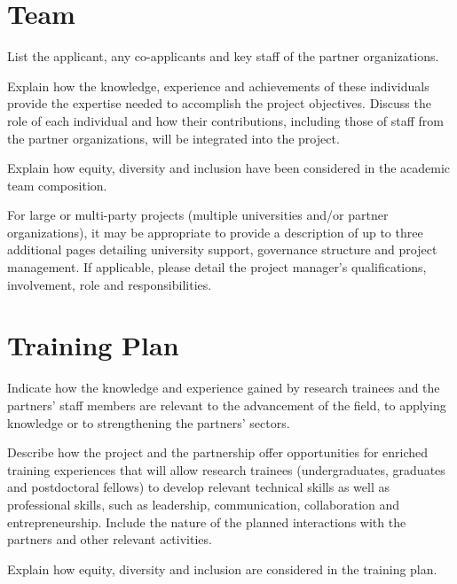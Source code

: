 \documentclass[english]{nserc-alliance}
\begin{document}
\section*{Team}
\ifinst\begin{instructions}
\item List the applicant, any co-applicants and key staff of the partner organizations.
\item Explain how the knowledge, experience and achievements of these individuals provide the expertise needed to accomplish the project objectives. Discuss the role of each individual and how their contributions, including those of staff from the partner organizations, will be integrated into the project.
\item Explain how equity, diversity and inclusion have been considered in the academic team composition.
\item For large or multi-party projects (multiple universities and/or partner organizations), it may be appropriate to provide a description of up to three additional pages detailing university support, governance structure and project management. If applicable, please detail the project manager’s qualifications, involvement, role and responsibilities.
\end{instructions}\fi

\section*{Training Plan}
\ifinst\begin{instructions}
\item Indicate how the knowledge and experience gained by research trainees and the partners’ staff members are relevant to the advancement of the field, to applying knowledge or to strengthening the partners’ sectors.
\item Describe how the project and the partnership offer opportunities for enriched training experiences that will allow research trainees (undergraduates, graduates and postdoctoral fellows) to develop relevant technical skills as well as professional skills, such as leadership, communication, collaboration and entrepreneurship. Include the nature of the planned interactions with the partners and other relevant activities.
\item Explain how equity, diversity and inclusion are considered in the training plan.
\end{instructions}\fi
\end{document}
